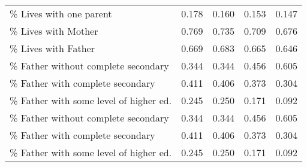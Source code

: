 {\begin{tabular}{lcccc}
\% Lives with one parent&       0.178&       0.160&       0.153&       0.147\\
\% Lives with Mother&       0.769&       0.735&       0.709&       0.676\\
\% Lives with Father&       0.669&       0.683&       0.665&       0.646\\
\% Father without complete secondary&       0.344&       0.344&       0.456&       0.605\\
\% Father with complete secondary&       0.411&       0.406&       0.373&       0.304\\
\% Father with some level of higher ed.&       0.245&       0.250&       0.171&       0.092\\
\% Father without complete secondary&       0.344&       0.344&       0.456&       0.605\\
\% Father with complete secondary&       0.411&       0.406&       0.373&       0.304\\
\% Father with some level of higher ed.&       0.245&       0.250&       0.171&       0.092\\

\bottomrule
\end{tabular}
}
